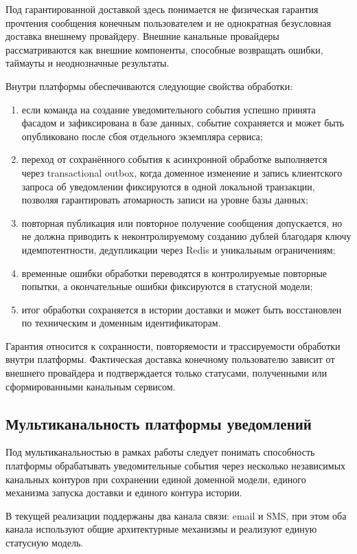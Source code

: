 Под гарантированной доставкой здесь понимается не физическая гарантия прочтения сообщения конечным пользователем и не однократная безусловная доставка внешнему провайдеру. Внешние канальные провайдеры рассматриваются как внешние компоненты, способные возвращать ошибки, таймауты и неоднозначные результаты.

Внутри платформы обеспечиваются следующие свойства обработки:
\begin{enumerate}
    \item если команда на создание уведомительного события успешно принята фасадом и зафиксирована в базе данных, событие сохраняется и может быть опубликовано после сбоя отдельного экземпляра сервиса;
    \item переход от сохранённого события к асинхронной обработке выполняется через transactional outbox, когда доменное изменение и запись клиентского запроса об уведомлении фиксируются в одной локальной транзакции, позволяя гарантировать атомарность записи на уровне базы данных;
    \item повторная публикация или повторное получение сообщения допускается, но не должна приводить к неконтролируемому созданию дублей благодаря ключу идемпотентности, дедупликации через Redis и уникальным ограничениям;
    \item временные ошибки обработки переводятся в контролируемые повторные попытки, а окончательные ошибки фиксируются в статусной модели;
    \item итог обработки сохраняется в истории доставки и может быть восстановлен по техническим и доменным идентификаторам.
\end{enumerate}

Гарантия относится к сохранности, повторяемости и трассируемости обработки внутри платформы. Фактическая доставка конечному пользователю зависит от внешнего провайдера и подтверждается только статусами, полученными или сформированными канальным сервисом.

\subsection{Мультиканальность платформы уведомлений}

Под мультиканальностью в рамках работы следует понимать способность платформы обрабатывать уведомительные события через несколько независимых канальных контуров при сохранении единой доменной модели, единого механизма запуска доставки и единого контура истории.

В текущей реализации поддержаны два канала связи: email и SMS, при этом оба канала используют общие архитектурные механизмы и реализуют единую статусную модель.

